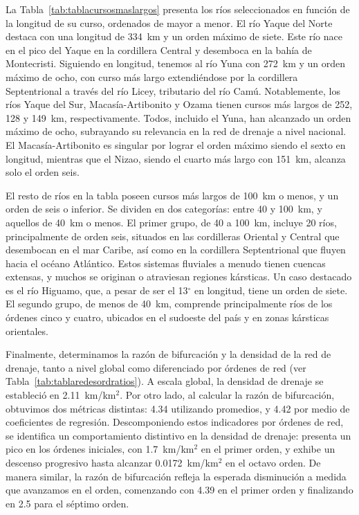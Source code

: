 \documentclass[spanish]{article}
\begin{document}
La Tabla~\ref{tab:tablacursosmaslargos} presenta los ríos seleccionados
en función de la longitud de su curso, ordenados de mayor a menor. El
río Yaque del Norte destaca con una longitud de 334~km y un orden máximo
de siete. Este río nace en el pico del Yaque en la cordillera Central y
desemboca en la bahía de Montecristi. Siguiendo en longitud, tenemos al
río Yuna con 272~km y un orden máximo de ocho, con curso más largo
extendiéndose por la cordillera Septentrional a través del río Licey,
tributario del río Camú. Notablemente, los ríos Yaque del Sur,
Macasía-Artibonito y Ozama tienen cursos más largos de 252, 128 y
149~km, respectivamente. Todos, incluido el Yuna, han alcanzado un orden
máximo de ocho, subrayando su relevancia en la red de drenaje a nivel
nacional. El Macasía-Artibonito es singular por lograr el orden máximo
siendo el sexto en longitud, mientras que el Nizao, siendo el cuarto más
largo con 151~km, alcanza solo el orden seis.

El resto de ríos en la tabla poseen cursos más largos de 100~km o menos,
y un orden de seis o inferior. Se dividen en dos categorías: entre 40 y
100~km, y aquellos de 40~km o menos. El primer grupo, de 40 a 100~km,
incluye 20 ríos, principalmente de orden seis, situados en las
cordilleras Oriental y Central que desembocan en el mar Caribe, así como
en la cordillera Septentrional que fluyen hacia el océano Atlántico.
Estos sistemas fluviales a menudo tienen cuencas extensas, y muchos se
originan o atraviesan regiones kársticas. Un caso destacado es el río
Higuamo, que, a pesar de ser el 13\(^\circ\) en longitud, tiene un orden
de siete. El segundo grupo, de menos de 40~km, comprende principalmente
ríos de los órdenes cinco y cuatro, ubicados en el sudoeste del país y
en zonas kársticas orientales.

Finalmente, determinamos la razón de bifurcación y la densidad de la red
de drenaje, tanto a nivel global como diferenciado por órdenes de red
(ver Tabla~\ref{tab:tablaredesordratios}). A escala global, la densidad
de drenaje se estableció en 2.11~km/km\(^2\). Por otro lado, al calcular
la razón de bifurcación, obtuvimos dos métricas distintas: 4.34
utilizando promedios, y 4.42 por medio de coeficientes de regresión.
Descomponiendo estos indicadores por órdenes de red, se identifica un
comportamiento distintivo en la densidad de drenaje: presenta un pico en
los órdenes iniciales, con 1.7~km/km\(^2\) en el primer orden, y exhibe
un descenso progresivo hasta alcanzar 0.0172~km/km\(^2\) en el octavo
orden. De manera similar, la razón de bifurcación refleja la esperada
disminución a medida que avanzamos en el orden, comenzando con 4.39 en
el primer orden y finalizando en 2.5 para el séptimo orden.
\end{document}
